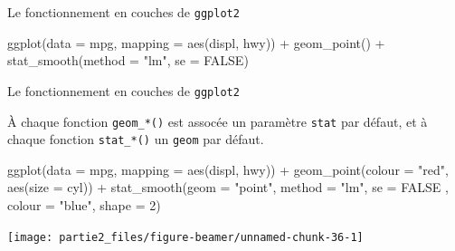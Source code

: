 \documentclass[12pt,ignorenonframetext,]{beamer}
\newenvironment{Shaded}{}{}
\newcommand{\KeywordTok}[1]{\textcolor[rgb]{0.00,0.00,1.00}{#1}}
\newcommand{\DataTypeTok}[1]{#1}
\newcommand{\DecValTok}[1]{#1}
\newcommand{\StringTok}[1]{\textcolor[rgb]{0.00,0.50,0.50}{#1}}
\newcommand{\OtherTok}[1]{\textcolor[rgb]{1.00,0.25,0.00}{#1}}
\newcommand{\OperatorTok}[1]{#1}
\newcommand{\NormalTok}[1]{#1}
\renewenvironment{Shaded}{\begin{snugshade}}{\end{snugshade}}
\begin{document}
\begin{frame}[fragile]{\large Le fonctionnement en \og couches \fg{} de
\texttt{ggplot2}}
\begin{Shaded}
\begin{Highlighting}[]
\KeywordTok{ggplot}\NormalTok{(}\DataTypeTok{data =}\NormalTok{ mpg, }\DataTypeTok{mapping =} \KeywordTok{aes}\NormalTok{(displ, hwy)) }\OperatorTok{+}\StringTok{ }
\StringTok{  }\KeywordTok{geom_point}\NormalTok{() }\OperatorTok{+}\StringTok{ }\KeywordTok{stat_smooth}\NormalTok{(}\DataTypeTok{method =} \StringTok{"lm"}\NormalTok{, }\DataTypeTok{se =} \OtherTok{FALSE}\NormalTok{)}
\end{Highlighting}
\end{Shaded}

\end{frame}

\begin{frame}[fragile]{\large Le fonctionnement en \og couches \fg{} de
\texttt{ggplot2}}

À chaque fonction \texttt{geom\_*()} est assocée un paramètre
\texttt{stat} par défaut, et à chaque fonction \texttt{stat\_*()} un
\texttt{geom} par défaut.

\footnotesize \center

\begin{Shaded}
\begin{Highlighting}[]
\KeywordTok{ggplot}\NormalTok{(}\DataTypeTok{data =}\NormalTok{ mpg, }\DataTypeTok{mapping =} \KeywordTok{aes}\NormalTok{(displ, hwy)) }\OperatorTok{+}\StringTok{ }
\StringTok{  }\KeywordTok{geom_point}\NormalTok{(}\DataTypeTok{colour =} \StringTok{"red"}\NormalTok{, }\KeywordTok{aes}\NormalTok{(}\DataTypeTok{size =}\NormalTok{ cyl)) }\OperatorTok{+}\StringTok{ }
\StringTok{  }\KeywordTok{stat_smooth}\NormalTok{(}\DataTypeTok{geom =} \StringTok{"point"}\NormalTok{, }\DataTypeTok{method =} \StringTok{"lm"}\NormalTok{, }\DataTypeTok{se =} \OtherTok{FALSE}
\NormalTok{    , }\DataTypeTok{colour =} \StringTok{"blue"}\NormalTok{, }\DataTypeTok{shape =} \DecValTok{2}\NormalTok{)}
\end{Highlighting}
\end{Shaded}

\texttt{[image: partie2\_files/figure-beamer/unnamed-chunk-36-1]}

\end{frame}
\end{document}
